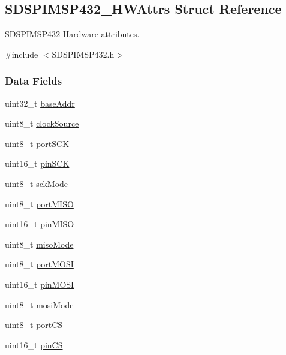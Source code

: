 \subsection{S\+D\+S\+P\+I\+M\+S\+P432\+\_\+\+H\+W\+Attrs Struct Reference}
\label{struct_s_d_s_p_i_m_s_p432___h_w_attrs}


S\+D\+S\+P\+I\+M\+S\+P432 Hardware attributes.  




{\ttfamily \#include $<$S\+D\+S\+P\+I\+M\+S\+P432.\+h$>$}

\subsubsection*{Data Fields}
\begin{DoxyCompactItemize}
\item 
uint32\+\_\+t \hyperlink{struct_s_d_s_p_i_m_s_p432___h_w_attrs_a134745a8eb8a2408839bd8c2a963daa2}{base\+Addr}
\item 
uint8\+\_\+t \hyperlink{struct_s_d_s_p_i_m_s_p432___h_w_attrs_a6e09a1b875b8f38fe2683387f1d1fe38}{clock\+Source}
\item 
uint8\+\_\+t \hyperlink{struct_s_d_s_p_i_m_s_p432___h_w_attrs_acf1acd8736dd82f0e85559429ed6001b}{port\+S\+C\+K}
\item 
uint16\+\_\+t \hyperlink{struct_s_d_s_p_i_m_s_p432___h_w_attrs_a9042db1505ac118be9a2a1d11add2479}{pin\+S\+C\+K}
\item 
uint8\+\_\+t \hyperlink{struct_s_d_s_p_i_m_s_p432___h_w_attrs_a106a126808e7b95bf821468ea3039f3e}{sck\+Mode}
\item 
uint8\+\_\+t \hyperlink{struct_s_d_s_p_i_m_s_p432___h_w_attrs_a89cba832134fe531950e7867be0acb7f}{port\+M\+I\+S\+O}
\item 
uint16\+\_\+t \hyperlink{struct_s_d_s_p_i_m_s_p432___h_w_attrs_a4180222930f88549241e8e30439bda40}{pin\+M\+I\+S\+O}
\item 
uint8\+\_\+t \hyperlink{struct_s_d_s_p_i_m_s_p432___h_w_attrs_ae0e79cad9886bbfe375bac67cad7a3bd}{miso\+Mode}
\item 
uint8\+\_\+t \hyperlink{struct_s_d_s_p_i_m_s_p432___h_w_attrs_a976ad71c5bbcb3f672328c5262762674}{port\+M\+O\+S\+I}
\item 
uint16\+\_\+t \hyperlink{struct_s_d_s_p_i_m_s_p432___h_w_attrs_a7b92952eae31e7fa69a71a3e04efeea9}{pin\+M\+O\+S\+I}
\item 
uint8\+\_\+t \hyperlink{struct_s_d_s_p_i_m_s_p432___h_w_attrs_a07d34fc63e107fd13cfe6f346cde7b25}{mosi\+Mode}
\item 
uint8\+\_\+t \hyperlink{struct_s_d_s_p_i_m_s_p432___h_w_attrs_ab77457eafc5a25242ac05ed97faf420e}{port\+C\+S}
\item 
uint16\+\_\+t \hyperlink{struct_s_d_s_p_i_m_s_p432___h_w_attrs_aa1728785c98fc4498d8b3e185918293d}{pin\+C\+S}
\end{DoxyCompactItemize}


